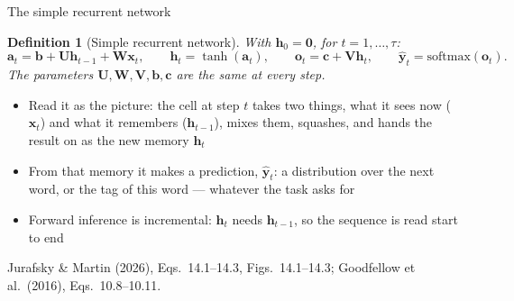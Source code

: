 \documentclass[aspectratio=169, 11pt]{beamer}
\newtheorem{defx}[theorem]{Definition}
\newcommand{\srcline}[1]{%
  \par\vspace{0.25em}%
  {\scriptsize\color{mcMuted}\hfill #1\par}}
\begin{document}
\begin{frame}{The simple recurrent network}
  \vspace{-0.45em}
  \begin{defx}[Simple recurrent network]\label{th:rnn}
    \small
    With $\mathbf{h}_0 = \mathbf{0}$, for $t = 1, \ldots, \tau$:
    \[
      \mathbf{a}_t = \mathbf{b} + \mathbf{U}\mathbf{h}_{t-1} + \mathbf{W}\mathbf{x}_t, \qquad
      \mathbf{h}_t = \tanh(\mathbf{a}_t), \qquad
      \mathbf{o}_t = \mathbf{c} + \mathbf{V}\mathbf{h}_t, \qquad
      \hat{\mathbf{y}}_t = \mathrm{softmax}(\mathbf{o}_t).
    \]
    The parameters $\mathbf{U}, \mathbf{W}, \mathbf{V}, \mathbf{b}, \mathbf{c}$ are the same at every step.
  \end{defx}
  \vspace{-0.1em}
  {\footnotesize
  \begin{itemize}\itemsep0.16em
    \item Read it as the picture: the cell at step $t$ takes two things,
          \alert{what it sees now} ($\mathbf{x}_t$) and \alert{what it
          remembers} ($\mathbf{h}_{t-1}$), mixes them, squashes, and hands the
          result on as the new memory $\mathbf{h}_t$
    \item From that memory it makes a prediction, $\hat{\mathbf{y}}_t$: a
          distribution over the next word, or the tag of this word ---
          whatever the task asks for
    \item Forward inference is \alert{incremental}: $\mathbf{h}_t$ needs
          $\mathbf{h}_{t-1}$, so the sequence is read start to end
  \end{itemize}}
  \srcline{Jurafsky \& Martin (2026), Eqs.~14.1--14.3, Figs.~14.1--14.3; Goodfellow et al.\ (2016), Eqs.~10.8--10.11.}
\end{frame}
\end{document}
